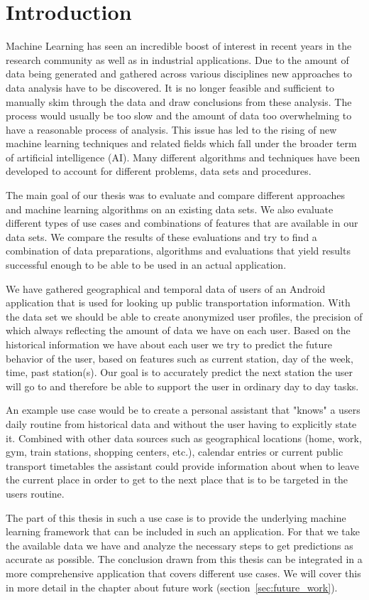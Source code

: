 \newpage
\section{Introduction}

Machine Learning has seen an incredible boost of interest in recent years in the research community as well as in industrial applications. Due to the amount of data being generated and gathered across various disciplines new approaches to data analysis have to be discovered. It is no longer feasible and sufficient to manually skim through the data and draw conclusions from these analysis. The process would usually be too slow and the amount of data too overwhelming to have a reasonable process of analysis. This issue has led to the rising of new machine learning techniques and related fields which fall under the broader term of artificial intelligence (AI). Many different algorithms and techniques have been developed to account for different problems, data sets and procedures.

The main goal of our thesis was to evaluate and compare different approaches and machine learning algorithms on an existing data sets. We also evaluate different types of use cases and combinations of features that are available in our data sets. We compare the results of these evaluations and try to find a combination of data preparations, algorithms and evaluations that yield results successful enough to be able to be used in an actual application. 

We have gathered geographical and temporal data of users of an Android application that is used for looking up public transportation information. With the data set we should be able to create anonymized user profiles, the precision of which always reflecting the amount of data we have on each user. Based on the historical information we have about each user we try to predict the future behavior of the user, based on features such as current station, day of the week, time, past station(s). Our goal is to accurately predict the next station the user will go to and therefore be able to support the user in ordinary day to day tasks. 

An example use case would be to create a personal assistant that "knows" a users daily routine from historical data and without the user having to explicitly state it. Combined with other data sources such as geographical locations (home, work, gym, train stations, shopping centers, etc.), calendar entries or current public transport timetables the assistant could provide information about when to leave the current place in order to get to the next place that is to be targeted in the users routine. 

The part of this thesis in such a use case is to provide the underlying machine learning framework that can be included in such an application. For that we take the available data we have and analyze the necessary steps to get predictions as accurate as possible. The conclusion drawn from this thesis can be integrated in a more comprehensive application that covers different use cases. We will cover this in more detail in the chapter about future work (section~\ref{sec:future_work}).
